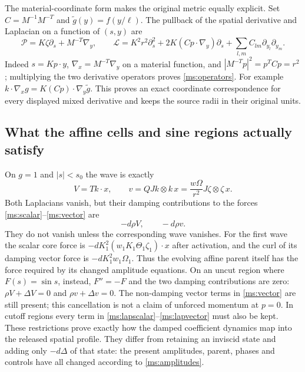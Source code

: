 The material-coordinate form makes the original metric equally
explicit. Set $C=M^{-1}M^{-T}$ and $\widetilde g(y)=f(y/\ell)$.
The pullback of the spatial derivative and Laplacian on a function
of $(s,y)$ are
\begin{equation}\label{ms:operators}
 \mathcal P=K\zeta\partial_s+M^{-T}\nabla_y,
 \qquad\mathcal L=K^2r^2\partial_s^2
             +2K(Cp\cdot\nabla_y)\partial_s+
                       \sum_{l,m}C_{lm}\partial_{y_l}\partial_{y_m}.
\end{equation}
Indeed $s=Kp\cdot y$, $\nabla_x=M^{-T}\nabla_y$ on a
material function, and $|M^{-T}p|^2=p^TCp=r^2$; multiplying
the two derivative operators proves \eqref{ms:operators}.
For example $k\cdot\nabla_xg=K(Cp)\cdot\nabla_y\widetilde g$.
This proves an exact coordinate correspondence for every displayed
mixed derivative and keeps the source radii in their original units.

\subsection{What the affine cells and sine regions actually satisfy}

On $g=1$ and $|s|<s_0$ the wave is exactly
\[
 V=T k\cdot x,\qquad
 v=QJk\otimes k\,x
   =\frac{w\Omega}{r^2}J\zeta\otimes\zeta\,x.
\]
Both Laplacians vanish, but their damping contributions to the
forces \eqref{ms:scalar}--\eqref{ms:vector} are
\begin{equation}\label{ms:coreforces}
 -d\rho V,\qquad -d\rho v.
\end{equation}
They do not vanish unless the corresponding wave vanishes.
For the first wave the scalar core force is
$-dK_1^2(w_1K_1\Theta_1\zeta_1)\cdot x$ after activation,
and the curl of its damping vector force is
$-dK_1^2w_1\Omega_1$. Thus the evolving affine parent itself
has the force required by its changed amplitude equations.
On an uncut region where $F(s)=\sin s$, instead,
$F''=-F$ and the two damping contributions are zero:
$\rho V+\Delta V=0$ and $\rho v+\Delta v=0$.
The non-damping vector terms in \eqref{ms:vector} are still
present; this cancellation is not a claim of unforced momentum
at $p=0$. In cutoff regions every term in
\eqref{ms:lapscalar}--\eqref{ms:lapvector} must also be kept.
These restrictions prove exactly how the damped coefficient
dynamics map into the released spatial profile. They differ
from retaining an inviscid state and adding only $-d\Delta$ of
that state: the present amplitudes, parent, phases and controls
have all changed according to \eqref{ms:amplitudes}.

